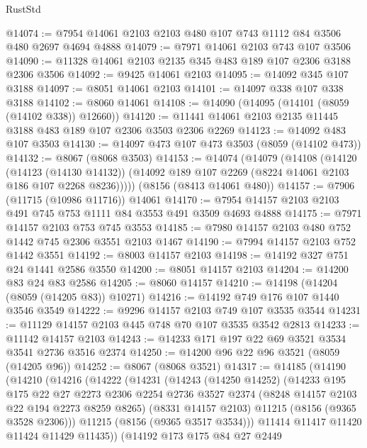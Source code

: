 \begin{lexlean}{RustStd}
\begin{coremodule}
{\begin{coremodule}
{{{{{{{{{{{{{{{{{{{{{{{{{{{{{{{{{{@14074 := @7954 @14061 @2103 @2103 @480 @107 @743 @1112 @84 @3506 @480 @2697 @4694 @4888
@14079 := @7971 @14061 @2103 @743 @107 @3506
@14090 := @11328 @14061 @2103 @2135 @345 @483 @189 @107 @2306 @3188 @2306 @3506
@14092 := @9425 @14061 @2103
@14095 := @14092 @345 @107 @3188
@14097 := @8051 @14061 @2103
@14101 := @14097 @338 @107 @338 @3188
@14102 := @8060 @14061
@14108 := @14090 (@14095 (@14101 (@8059 (@14102 @338)) @12660))
@14120 := @11441 @14061 @2103 @2135 @11445 @3188 @483 @189 @107 @2306 @3503 @2306 @2269
@14123 := @14092 @483 @107 @3503
@14130 := @14097 @473 @107 @473 @3503 (@8059 (@14102 @473))
@14132 := @8067 (@8068 @3503)
@14153 := @14074
    (@14079
      (@14108
        (@14120
          (@14123 (@14130 @14132))
          (@14092 @189 @107 @2269 (@8224 @14061 @2103 @186 @107 @2268 @8236)))))
    (@8156 (@8413 @14061 @480))
@14157 := @7906 (@11715 (@10986 @11716)) @14061
@14170 := @7954 @14157 @2103 @2103 @491 @745 @753 @1111 @84 @3553 @491 @3509 @4693 @4888
@14175 := @7971 @14157 @2103 @753 @745 @3553
@14185 := @7980 @14157 @2103 @480 @752 @1442 @745 @2306 @3551 @2103 @1467
@14190 := @7994 @14157 @2103 @752 @1442 @3551
@14192 := @8003 @14157 @2103
@14198 := @14192 @327 @751 @24 @1441 @2586 @3550
@14200 := @8051 @14157 @2103
@14204 := @14200 @83 @24 @83 @2586
@14205 := @8060 @14157
@14210 := @14198 (@14204 (@8059 (@14205 @83)) @10271)
@14216 := @14192 @749 @176 @107 @1440 @3546 @3549
@14222 := @9296 @14157 @2103 @749 @107 @3535 @3544
@14231 := @11129 @14157 @2103 @445 @748 @70 @107 @3535 @3542 @2813
@14233 := @11142 @14157 @2103
@14243 := @14233 @171 @197 @22 @69 @3521 @3534 @3541 @2736 @3516 @2374
@14250 := @14200 @96 @22 @96 @3521 (@8059 (@14205 @96))
@14252 := @8067 (@8068 @3521)
@14317 := @14185
    (@14190
      (@14210
        (@14216
          (@14222
            (@14231
              (@14243
                (@14250 @14252)
                (@14233
                  @195
                  @175
                  @22
                  @27
                  @2273
                  @2306
                  @2254
                  @2736
                  @3527
                  @2374
                  (@8248 @14157 @2103 @22 @194 @2273 @8259 @8265)
                  (@8331 @14157 @2103)
                  @11215
                  (@8156 (@9365 @3528 @2306)))
                @11215
                (@8156 (@9365 @3517 @3534)))
              @11414
              @11417
              @11420
              @11424
              @11429
              @11435))
          (@14192
            @173
            @175
            @84
            @27
            @2449
}}}}}}}}}}}}}}}}}}}}}}}}}}}}}}}}}}
\end{coremodule}}
\end{coremodule}
\end{lexlean}
